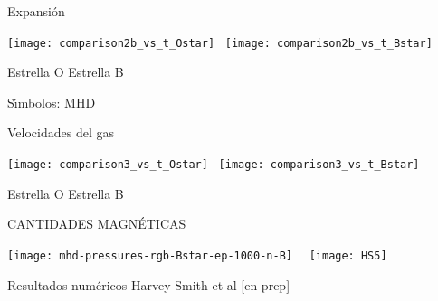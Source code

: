 \documentclass
[
]
{beamer}
\begin{document}
{
\begin{frame}[plain]
\centerline{Expansi\'on}
\vfill
\centering
\centerline{\texttt{[image: comparison2b\_vs\_t\_Ostar]}~%
\texttt{[image: comparison2b\_vs\_t\_Bstar]}}
\vfill
\centerline{\hfill Estrella O \hfill Estrella B \hfill}
\vfill
\centerline{S\'{\i}mbolos: MHD}
\end{frame}
\begin{frame}[plain]
\centerline{Velocidades del gas}
\vfill
\centering
\centerline{\texttt{[image: comparison3\_vs\_t\_Ostar]}~%
\texttt{[image: comparison3\_vs\_t\_Bstar]}}
\vfill
\centerline{\hfill Estrella O \hfill Estrella B \hfill}
\end{frame}
}
{
\begin{frame}[plain]
\centerline{CANTIDADES MAGN\'ETICAS}
\vfill
\centering
\centerline{\texttt{[image: mhd-pressures-rgb-Bstar-ep-1000-n-B]}~\hfill~%
\texttt{[image: HS5]}}
\vfill
\centerline{Resultados num\'ericos \hfill Harvey-Smith et al
  [en prep]}
\end{frame}
}
\end{document}
